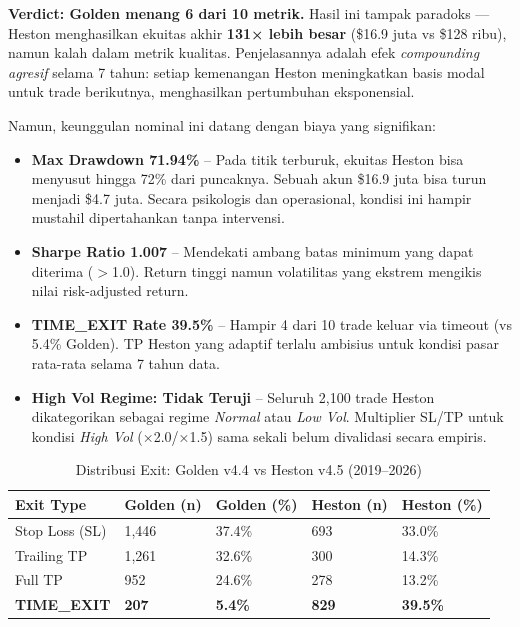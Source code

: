 \textbf{Verdict: Golden menang 6 dari 10 metrik.} Hasil ini tampak paradoks --- Heston menghasilkan ekuitas akhir \textbf{131× lebih besar} (\$16.9 juta vs \$128 ribu), namun kalah dalam metrik kualitas. Penjelasannya adalah efek \textit{compounding agresif} selama 7 tahun: setiap kemenangan Heston meningkatkan basis modal untuk trade berikutnya, menghasilkan pertumbuhan eksponensial.

Namun, keunggulan nominal ini datang dengan biaya yang signifikan:
\begin{itemize}
    \item \textbf{Max Drawdown 71.94\%} -- Pada titik terburuk, ekuitas Heston bisa menyusut hingga 72\% dari puncaknya. Sebuah akun \$16.9 juta bisa turun menjadi \$4.7 juta. Secara psikologis dan operasional, kondisi ini hampir mustahil dipertahankan tanpa intervensi.
    \item \textbf{Sharpe Ratio 1.007} -- Mendekati ambang batas minimum yang dapat diterima ($>$1.0). Return tinggi namun volatilitas yang ekstrem mengikis nilai risk-adjusted return.
    \item \textbf{TIME\_EXIT Rate 39.5\%} -- Hampir 4 dari 10 trade keluar via timeout (vs 5.4\% Golden). TP Heston yang adaptif terlalu ambisius untuk kondisi pasar rata-rata selama 7 tahun data.
    \item \textbf{High Vol Regime: Tidak Teruji} -- Seluruh 2,100 trade Heston dikategorikan sebagai regime \textit{Normal} atau \textit{Low Vol}. Multiplier SL/TP untuk kondisi \textit{High Vol} (×2.0/×1.5) sama sekali belum divalidasi secara empiris.
\end{itemize}

\begin{table}[h!]
\centering
\caption{Distribusi Exit: Golden v4.4 vs Heston v4.5 (2019--2026)}
\label{table:exit_dist_7y}
\begin{tabular}{@{}lllll@{}}
\toprule
\textbf{Exit Type} & \textbf{Golden (n)} & \textbf{Golden (\%)} & \textbf{Heston (n)} & \textbf{Heston (\%)} \\ \midrule
Stop Loss (SL)     & 1,446 & 37.4\% & 693  & 33.0\% \\
Trailing TP        & 1,261 & 32.6\% & 300  & 14.3\% \\
Full TP            & 952   & 24.6\% & 278  & 13.2\% \\
\textbf{TIME\_EXIT}& \textbf{207}   & \textbf{5.4\%}  & \textbf{829}  & \textbf{39.5\%} \\
\bottomrule
\end{tabular}
\end{table}

